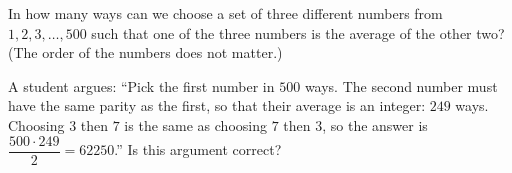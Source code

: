 In how many ways can we choose a set of three different numbers from $1,2,3,\dots,500$ such that one of the three numbers is the average of the other two? (The order of the numbers does not matter.)

A student argues: ``Pick the first number in $500$ ways. The second number must have the same parity as the first, so that their average is an integer: $249$ ways. Choosing $3$ then $7$ is the same as choosing $7$ then $3$, so the answer is $\dfrac{500\cdot249}{2}=62250$.'' Is this argument correct?
